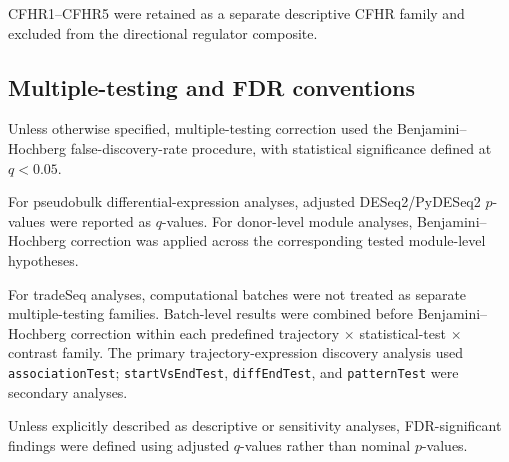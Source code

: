 \documentclass[10pt,letterpaper]{article}
\begin{document}
CFHR1--CFHR5 were retained as a separate descriptive CFHR family and excluded from the directional regulator composite.

\subsection*{Multiple-testing and FDR conventions}

Unless otherwise specified, multiple-testing correction used the Benjamini--Hochberg false-discovery-rate procedure, with statistical significance defined at $q < 0.05$.

For pseudobulk differential-expression analyses, adjusted DESeq2/PyDESeq2 $p$-values were reported as $q$-values. For donor-level module analyses, Benjamini--Hochberg correction was applied across the corresponding tested module-level hypotheses.

For tradeSeq analyses, computational batches were not treated as separate multiple-testing families. Batch-level results were combined before Benjamini--Hochberg correction within each predefined trajectory $\times$ statistical-test $\times$ contrast family. The primary trajectory-expression discovery analysis used \texttt{associationTest}; \texttt{startVsEndTest}, \texttt{diffEndTest}, and \texttt{patternTest} were secondary analyses.

Unless explicitly described as descriptive or sensitivity analyses, FDR-significant findings were defined using adjusted $q$-values rather than nominal $p$-values.
\end{document}
